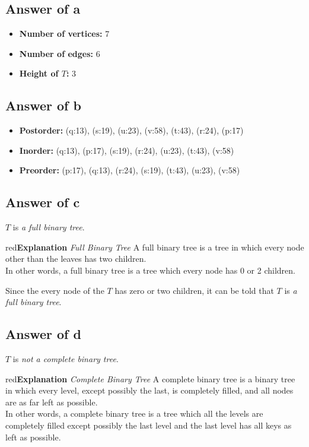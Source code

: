 \documentclass[12pt]{article}
\newenvironment{explanation}[1][\unskip]{\begin{mybox}{red}{\textbf{Explanation} \textit{#1}}}{\end{mybox}}
\begin{document}
\subsection*{Answer of a}

\begin{itemize}
    \item \textbf{Number of vertices:} 7
    \item \textbf{Number of edges:} 6
    \item \textbf{Height of $T$:} 3
\end{itemize}

\subsection*{Answer of b}

\begin{itemize}
    \item \textbf{Postorder:} (q:13), (s:19), (u:23), (v:58), (t:43), (r:24), (p:17)
    \item \textbf{Inorder:} (q:13), (p:17), (s:19), (r:24), (u:23), (t:43), (v:58)
    \item \textbf{Preorder:} (p:17), (q:13), (r:24), (s:19), (t:43), (u:23), (v:58)
\end{itemize}

\subsection*{Answer of c}

$T$ is \textit{a full binary tree}.

\begin{explanation}[Full Binary Tree]
A full binary tree is a tree in which every node other than the leaves has two children.\\

In other words, a full binary tree is a tree which every node has 0 or 2 children.
\end{explanation}

\noindent Since the every node of the $T$ has zero or two children, it can be told that $T$ is \textit{a full binary tree}.

\subsection*{Answer of d}

$T$ is \textit{not a complete binary tree}.

\begin{explanation}[Complete Binary Tree]
A complete binary tree is a binary tree in which every level, except possibly the last, is completely filled, and all nodes are as far left as possible.\\

In other words, a complete binary tree is a tree which all the levels are completely filled except possibly the last level and the last level has all keys as left as possible.
\end{explanation}
\end{document}
